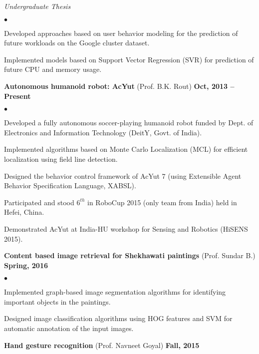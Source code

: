 \documentclass[margin,line]{res}
\newenvironment{list2}{
  \begin{list}{$\bullet$}{%
      \setlength{\itemsep}{0in}
      \setlength{\parsep}{0in} \setlength{\parskip}{0in}
      \setlength{\topsep}{0in} \setlength{\partopsep}{0in} 
      \setlength{\leftmargin}{0.2in}}}{\end{list}}
\begin{document}
\begin{resume}
\vspace{-.3cm}
{\em Undergraduate Thesis}
\vspace*{.2cm}
\begin{list2}
	\item Developed approaches based on user behavior modeling for the prediction of future workloads on the Google cluster dataset.
	\item Implemented models based on Support Vector Regression (SVR) for prediction of future CPU and memory usage.
\end{list2}

\begin{minipage}{\linewidth}
{\bf Autonomous humanoid robot: AcYut} (Prof. B.K. Rout) \hfill {\bf Oct, 2013 -- Present}

\vspace*{.2cm}
\begin{list2}
\item Developed a fully autonomous soccer-playing humanoid robot funded by Dept. of Electronics and Information Technology (DeitY, Govt. of India).
\item Implemented algorithms based on Monte Carlo Localization (MCL) for efficient localization using field line detection.
\item Designed the behavior control framework of AcYut 7 (using Extensible Agent Behavior Specification Language, XABSL).
\item Participated and stood $6^{th}$ in RoboCup 2015 (only team from India) held in Hefei, China.
\item Demonstrated AcYut at India-HU workshop for Sensing and Robotics (HiSENS 2015).
\end{list2}
\end{minipage}

{\bf Content based image retrieval for Shekhawati paintings} (Prof. Sundar B.) \hfill {\bf Spring, 2016}

\vspace*{.2cm}
\begin{list2}
\item Implemented graph-based image segmentation algorithms for identifying important objects in the paintings.
\item Designed image classification algorithms using HOG features and SVM for automatic annotation of the input images.	
\end{list2}

{\bf Hand gesture recognition} (Prof. Navneet Goyal) \hfill {\bf Fall, 2015}


\end{resume}
\end{document}
